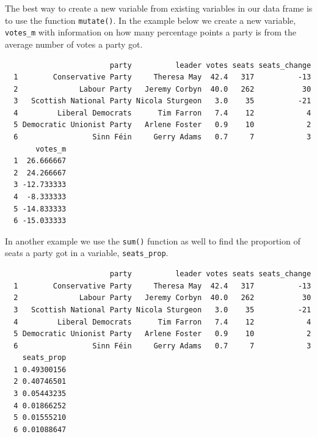 \documentclass[12pt,oneside]{reedthesis}
\theoremstyle{definition}
\theoremstyle{definition}
\theoremstyle{definition}
\theoremstyle{remark}
\begin{document}
  The best way to create a new variable from existing variables in our
  data frame is to use the function \texttt{mutate()}. In the example
  below we create a new variable, \texttt{votes\_m} with information on
  how many percentage points a party is from the average number of votes a
  party got.
  \begin{Shaded}
  \begin{Highlighting}[]
  \OperatorTok{-}\StringTok{ }
  \end{Highlighting}
  \end{Shaded}
  \begin{verbatim}
                        party          leader votes seats seats_change
  1        Conservative Party     Theresa May  42.4   317          -13
  2              Labour Party   Jeremy Corbyn  40.0   262           30
  3   Scottish National Party Nicola Sturgeon   3.0    35          -21
  4         Liberal Democrats      Tim Farron   7.4    12            4
  5 Democratic Unionist Party   Arlene Foster   0.9    10            2
  6                 Sinn Féin     Gerry Adams   0.7     7            3
       votes_m
  1  26.666667
  2  24.266667
  3 -12.733333
  4  -8.333333
  5 -14.833333
  6 -15.033333
  \end{verbatim}
  In another example we use the \texttt{sum()} function as well to find
  the proportion of seats a party got in a variable, \texttt{seats\_prop}.
  \begin{Shaded}
  \begin{Highlighting}[]
  \OperatorTok{/}\StringTok{ }
  \end{Highlighting}
  \end{Shaded}
  \begin{verbatim}
                        party          leader votes seats seats_change
  1        Conservative Party     Theresa May  42.4   317          -13
  2              Labour Party   Jeremy Corbyn  40.0   262           30
  3   Scottish National Party Nicola Sturgeon   3.0    35          -21
  4         Liberal Democrats      Tim Farron   7.4    12            4
  5 Democratic Unionist Party   Arlene Foster   0.9    10            2
  6                 Sinn Féin     Gerry Adams   0.7     7            3
    seats_prop
  1 0.49300156
  2 0.40746501
  3 0.05443235
  4 0.01866252
  5 0.01555210
  6 0.01088647
  \end{verbatim}
\end{document}
